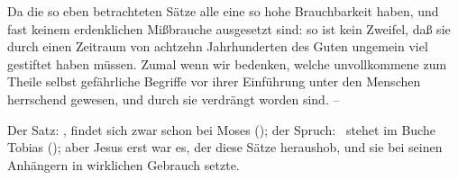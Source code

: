 Da die so eben betrachteten Sätze alle eine so hohe Brauchbarkeit haben, und fast keinem erdenklichen Mißbrauche ausgesetzt sind: so ist kein Zweifel, daß sie durch einen Zeitraum von achtzehn Jahrhunderten des Guten ungemein viel gestiftet haben müssen. Zumal wenn wir bedenken, welche unvollkommene zum Theile selbst gefährliche Begriffe vor ihrer Einführung unter den Menschen herrschend gewesen, und durch sie verdrängt worden sind. --\par
Der Satz: , findet sich zwar schon bei Moses (); der Spruch:  \usw\ stehet im Buche Tobias (); aber Jesus erst war es, der diese Sätze heraushob, und sie bei seinen Anhängern in wirklichen Gebrauch setzte.
